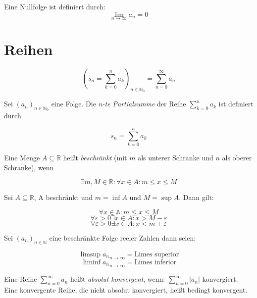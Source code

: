 \documentclass[11pt,a4paper,twocolumn]{article}
\newcommand{\ra}{\rightarrow}
\theoremstyle{area}
\renewcommand{\epsilon}{\varepsilon}
\begin{document}
Eine Nullfolge ist definiert durch: 
\[
    \lim_{n\ra\infty} a_n = 0
\]

\section{Reihen}

\begin{equation}
    (s_n = \sum_{k=0}^n a_k)_{n\in\mathbb{N}_0} = \sum_{n=0}^\infty a_n
\end{equation}

Sei $(a_n)_{n\in\mathbb{N}_0}$ eine Folge. Die \emph{n-te Partialsumme} der
Reihe $\sum_{k=0}^n a_k$ ist definiert durch

\[
    s_n = \sum_{k=0}^n a_k
\]

Eine Menge $A  \subseteq \mathbb{R}$ heißt \emph{beschränkt} (mit $m$
als unterer Schranke und $n$ als oberer Schranke), wenn

\begin{equation}
    \exists m, M \in \mathbb{R} : \forall x \in A : m \leq x \leq M
\end{equation}

Sei $A \subseteq \mathbb{R}$, A beschränkt und $m = \inf{A}$ und
$M = \sup{A}$. Dann gilt:

\begin{equation}
    \forall x \in \mathbb{A} : m \leq x \leq M
\end{equation}
\begin{equation}
    \forall \epsilon > 0 \exists x \in A : x > M - \epsilon
\end{equation}
\begin{equation}
    \forall \epsilon > 0 \exists x \in A : x < m + \epsilon
\end{equation}

Sei $(a_n)_{n\in\mathbb{N}}$ eine beschränkte Folge reeler Zahlen
dann seien:

\begin{equation}
    \limsup{a_n}_{n\ra\infty} = \text{Limes superior}
\end{equation}
\begin{equation}
    \liminf{a_n}_{n\ra\infty} = \text{Limes inferior}
\end{equation}

Eine Reihe $\sum_{n=0}^\infty a_n$ heißt \emph{absolut konvergent},
wenn: $\sum_{n=0}^\infty |a_n|$ konvergiert. Eine konvergente Reihe,
die nicht absolut konvergiert, heißt bedingt konvergent.
\end{document}
